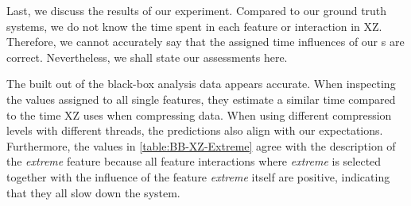 Last, we discuss the results of our experiment. Compared to our ground truth systems, 
we do not know the time spent in each feature or interaction in \textsc{XZ}. 
Therefore, we cannot accurately say that the assigned time influences of our {\perfInfluenceModel}s are correct. 
Nevertheless, we shall state our assessments here.

The {\perfInfluenceModel} built out of the black-box analysis data appears accurate. 
When inspecting the values assigned to all single features, they estimate a similar time compared to the time \textsc{XZ} uses when compressing data. 
When using different compression levels with different threads, the predictions also align with our expectations.
Furthermore, the values in \autoref{table:BB-XZ-Extreme} agree with the description of the \emph{extreme} feature because
all feature interactions where \emph{extreme} is selected together with the influence of the feature \emph{extreme} itself are positive,
indicating that they all slow down the system. 

